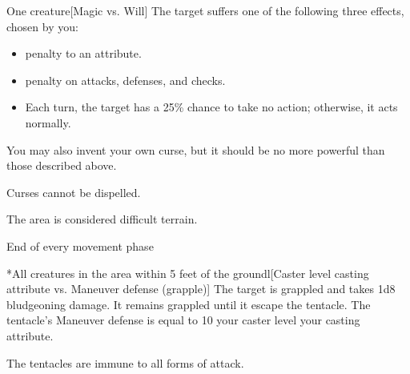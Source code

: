 \spellrng{\rngclose}
\begin{spelltarget}{One creature}[Magic vs. Will]
    \spellsuccess The target suffers one of the following three effects, chosen by you:
    \begin{itemize}
        \item {} penalty to an attribute.
        \item {} penalty on attacks, defenses, and checks.
        \item Each turn, the target has a 25\% chance to take no action; otherwise, it acts normally.
    \end{itemize}
    \par You may also invent your own curse, but it should be no more powerful than those described above.
\end{spelltarget}
\spellnotes Curses cannot be dispelled.

\spelldur{\durshort \dismissable}
\spellline
\spelleffect The area is considered difficult terrain.
\begin{spelltrigger}{End of every movement phase}
    \begin{spelltargets}*{All creatures in the area within 5 feet of the ground}l[Caster level \add casting attribute vs. Maneuver defense (grapple)]
        \spellsuccess The target is grappled and takes 1d8 bludgeoning damage. It remains grappled until it escape the tentacle. The tentacle's Maneuver defense is equal to 10 \add your caster level \add your casting attribute.
    \end{spelltargets}
\end{spelltrigger}
\spellnotes The tentacles are immune to all forms of attack.

